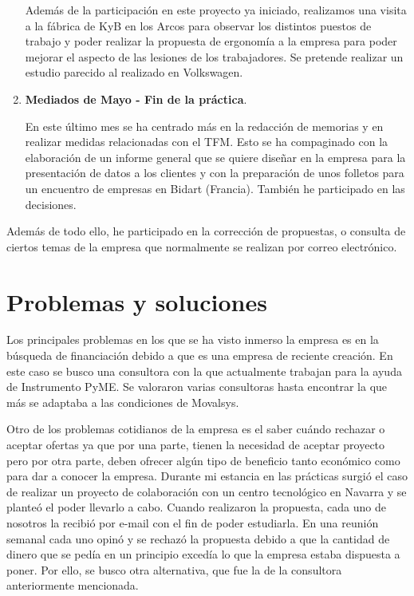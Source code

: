 \begin{enumerate}
					Además de la participación en este proyecto ya iniciado, realizamos una visita a la fábrica de KyB en los Arcos para observar los distintos puestos de trabajo y poder realizar la propuesta de ergonomía a la empresa para poder mejorar el aspecto de las lesiones de los trabajadores. Se pretende realizar un estudio parecido al realizado en Volkswagen.
					
					\item \textbf{Mediados de Mayo - Fin de la práctica}.
					
					En este último mes se ha centrado más en la redacción de memorias y en realizar medidas relacionadas con el TFM. Esto se ha compaginado con la elaboración de un informe general que se quiere diseñar en la empresa para la presentación de datos a los clientes y con la preparación de unos folletos para un encuentro de empresas en Bidart (Francia). También he participado en las decisiones.
					
				\end{enumerate}		
		
Además de todo ello, he participado en la corrección de propuestas, o consulta de ciertos temas de la empresa que normalmente se realizan por correo electrónico.
			
	\section{Problemas y soluciones}
	
Los principales problemas en los que se ha visto inmerso la empresa es en la búsqueda de financiación debido a que es una empresa de reciente creación. En este caso se busco una consultora con la que actualmente trabajan para la ayuda de Instrumento PyME. Se valoraron varias consultoras hasta encontrar la que más se adaptaba a las condiciones de Movalsys.

Otro de los problemas cotidianos de la empresa es el saber cuándo rechazar o aceptar ofertas ya que por una parte, tienen la necesidad de aceptar proyecto pero por otra parte, deben ofrecer algún tipo de beneficio tanto económico como para dar a conocer la empresa. Durante mi estancia en las prácticas surgió el caso de realizar un proyecto de colaboración con un centro tecnológico en Navarra y se planteó el poder llevarlo a cabo. Cuando realizaron la propuesta, cada uno de nosotros la recibió por e-mail con el fin de poder estudiarla. En una reunión semanal cada uno opinó y se rechazó la propuesta debido a que la cantidad de dinero que se pedía en un principio excedía lo que la empresa estaba dispuesta a poner. Por ello, se busco otra alternativa, que fue la de la consultora anteriormente mencionada.

